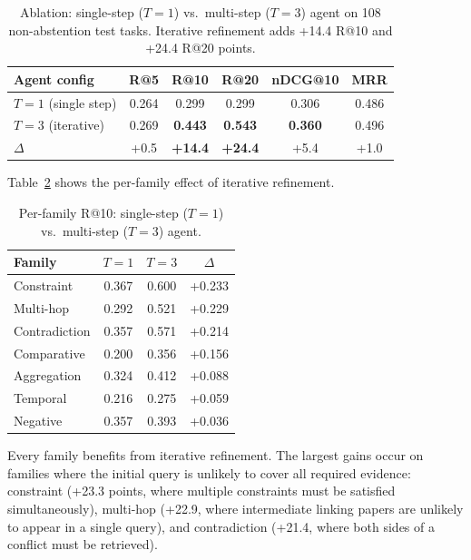 \documentclass{article}
\begin{document}
\begin{table}[ht]
\centering
\caption{Ablation: single-step ($T{=}1$) vs.\ multi-step ($T{=}3$) agent on 108 non-abstention test tasks. Iterative refinement adds +14.4 R@10 and +24.4 R@20 points.}
\label{tab:ablation}
\begin{tabular}{lccccc}
\toprule
\textbf{Agent config} & \textbf{R@5} & \textbf{R@10} & \textbf{R@20} & \textbf{nDCG@10} & \textbf{MRR} \\
\midrule
$T{=}1$ (single step) & 0.264 & 0.299 & 0.299 & 0.306 & 0.486 \\
$T{=}3$ (iterative) & 0.269 & \textbf{0.443} & \textbf{0.543} & \textbf{0.360} & 0.496 \\
\midrule
$\Delta$ & +0.5 & \textbf{+14.4} & \textbf{+24.4} & +5.4 & +1.0 \\
\bottomrule
\end{tabular}
\end{table}

Table~\ref{tab:ablation_family} shows the per-family effect of iterative refinement.

\begin{table}[ht]
\centering
\caption{Per-family R@10: single-step ($T{=}1$) vs.\ multi-step ($T{=}3$) agent.}
\small
\begin{tabular}{lccc}
\toprule
\textbf{Family} & $T{=}1$ & $T{=}3$ & $\Delta$ \\
\midrule
Constraint & 0.367 & 0.600 & +0.233 \\
Multi-hop & 0.292 & 0.521 & +0.229 \\
Contradiction & 0.357 & 0.571 & +0.214 \\
Comparative & 0.200 & 0.356 & +0.156 \\
Aggregation & 0.324 & 0.412 & +0.088 \\
Temporal & 0.216 & 0.275 & +0.059 \\
Negative & 0.357 & 0.393 & +0.036 \\
\bottomrule
\end{tabular}
\label{tab:ablation_family}
\end{table}

Every family benefits from iterative refinement. The largest gains occur on families where the initial query is unlikely to cover all required evidence: constraint (+23.3 points, where multiple constraints must be satisfied simultaneously), multi-hop (+22.9, where intermediate linking papers are unlikely to appear in a single query), and contradiction (+21.4, where both sides of a conflict must be retrieved).
\end{document}
